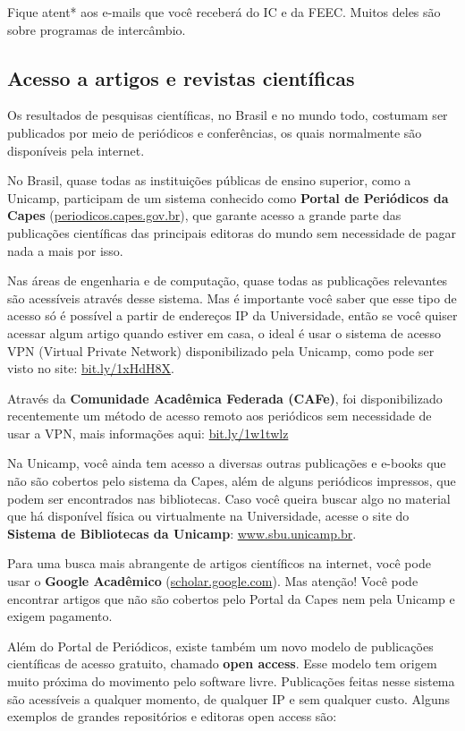 Fique atent* aos e-mails que você receberá do IC e da FEEC. Muitos deles são
sobre programas de intercâmbio.

\subsection{Acesso a artigos e revistas científicas}

Os resultados de pesquisas científicas, no Brasil e no mundo todo, costumam ser
publicados por meio de periódicos e conferências, os quais normalmente são
disponíveis pela internet.

No Brasil, quase todas as instituições públicas de ensino superior, como a
Unicamp, participam de um sistema conhecido como \textbf{Portal de Periódicos da
Capes} (\url{periodicos.capes.gov.br}), que garante acesso a grande parte das
publicações científicas das principais editoras do mundo sem necessidade de
pagar nada a mais por isso.

Nas áreas de engenharia e de computação, quase todas as publicações relevantes
são acessíveis através desse sistema. Mas é importante você saber que esse tipo
de acesso só é possível a partir de endereços IP da Universidade, então se você
quiser acessar algum artigo quando estiver em casa, o ideal é usar o sistema de
acesso VPN (Virtual Private Network) disponibilizado pela Unicamp, como pode ser
visto no site: \url{bit.ly/1xHdH8X}.

Através da \textbf{Comunidade Acadêmica Federada (CAFe)}, foi disponibilizado
recentemente um método de acesso remoto aos periódicos sem necessidade de usar a
VPN, mais informações aqui: \url{bit.ly/1w1twlz}

Na Unicamp, você ainda tem acesso a diversas outras publicações e e-books que
não são cobertos pelo sistema da Capes, além de alguns periódicos impressos, que
podem ser encontrados nas bibliotecas. Caso você queira buscar algo no material
que há disponível física ou virtualmente na Universidade, acesse o site do
\textbf{Sistema de Bibliotecas da Unicamp}: \url{www.sbu.unicamp.br}.

Para uma busca mais abrangente de artigos científicos na internet, você pode
usar o \textbf{Google Acadêmico} (\url{scholar.google.com}). Mas atenção! Você
pode encontrar artigos que não são cobertos pelo Portal da Capes nem pela
Unicamp e exigem pagamento.

Além do Portal de Periódicos, existe também um novo modelo de publicações
científicas de acesso gratuito, chamado \textbf{open access}. Esse modelo tem
origem muito próxima do movimento pelo software livre. Publicações feitas nesse
sistema são acessíveis a qualquer momento, de qualquer IP e sem qualquer custo.
Alguns exemplos de grandes repositórios e editoras open access são:

